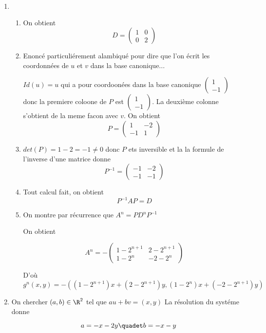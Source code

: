 \documentclass[a4paper, 11pt,reqno]{article}
\begin{document}
\begin{correction}
\begin{enumerate}
\item 
\begin{enumerate}
\item On obtient 
$$D=\begin{pmatrix}
1&0\\
0& 2
\end{pmatrix}$$
\item 
Enoncé particuliérement alambiqué pour dire que l'on écrit les coordonnées de $u$ et $v$ dans la base canonique...

$Id(u) = u $ qui a pour coordoonées dans la base canonique $\begin{pmatrix}
1\\
-1
\end{pmatrix}$ donc la premiere coloone de $P$ est $\begin{pmatrix}
1\\
-1
\end{pmatrix}$. La deuxième colonne s'obtient de la meme facon avec $v$. On obtient 
$$P=\begin{pmatrix}
1 & -2\\
-1& 1
\end{pmatrix}$$
\item
$det(P) = 1-2= -1\neq 0$ donc $P$ ets inversible et la 
la formule de l'inverse d'une matrice donne 
$$P^{-1} = \begin{pmatrix}
-1 & -2\\
-1 & -1
\end{pmatrix}$$

\item Tout calcul fait, on obtient 
$$P^{-1} A P = D$$

\item On montre par récurrence que $A^n = P D^n P^{-1}$

On obtient 

$$A^n =- \begin{pmatrix}
1-2^{n+1}&2-2^{n+1}\\
1-2^{n}& -2-2^{n}
\end{pmatrix}$$

D'où 
$$g^n (x,y) = -((1-2^{n+1})x + (2-2^{n+1})y , (1-2^{n})x + (-2-2^{n+1})y )$$


\end{enumerate}
\item
\begin{enumerate}
On chercher $(a,b)\in \R^2$ tel que $au+bv=(x,y)$ 
La résolution du systéme donne 

$$a=-x-2y \quadet b= -x-y$$



\end{enumerate}
\end{enumerate}
\end{correction}
\end{document}
